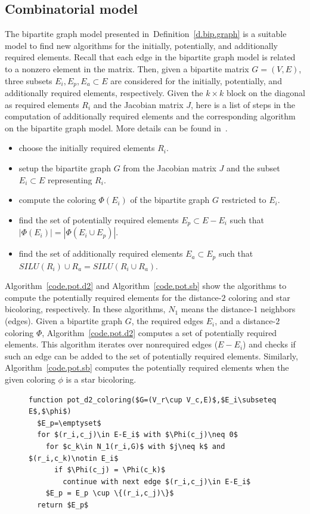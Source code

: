 \documentclass[12pt, twoside,a4paper,toc=bibliography]{scrbook}
\newcommand{\defref}[1]{Definition~\protect\ref{#1}}
\newcommand{\coderef}[1]{Algorithm~\protect\ref{#1}}
\begin{document}
\subsection{Combinatorial model}
\label{ss.comb.precond}
The bipartite graph model presented in~\defref{d.bip.graph} is
a suitable model to find new algorithms for the initially, potentially,
and additionally required elements.
Recall that each edge in the bipartite graph model is related to a nonzero element in
the matrix.
Then, given a bipartite matrix $G = (V,E)$,
three subsets $E_i, E_p, E_a\subset E$
are considered for the initially, potentially,
and additionally required elements, respectively.
Given the $k\times k$ block on the diagonal as required elements $R_i$ and the Jacobian matrix $J$,
here is a list of steps in the computation of additionally required elements
and the corresponding algorithm on the bipartite graph model.
More details can be found in~\cite{Lulfesmann2012Fap}.
\begin{itemize}
\item choose the initially required elements $R_i$.
\item setup the bipartite graph $G$ from the Jacobian matrix $J$ and the subset $E_i\subset E$ representing $R_i$.
\item compute the coloring $\Phi(E_i)$ of the bipartite graph $G$ restricted to $E_i$.
\item find the set of potentially required elements $E_p\subset E - E_i$ such that $|\Phi(E_i)| = |\Phi(E_i \cup E_p)|$.
\item find the set of additionally required elements $E_a\subset E_p$ such that $SILU(R_i) \cup R_a
    = SILU(R_i \cup R_a)$.
\end{itemize}
\coderef{code.pot.d2} and \coderef{code.pot.sb} show the algorithms to compute the
potentially required elements for the distance-$2$ coloring and star bicoloring, respectively.
In these algorithms, $N_1$ means the distance-$1$ neighbors (edges).
Given a bipartite graph $G$, the required edges $E_i$, and a distance-$2$ coloring $\Phi$,
\coderef{code.pot.d2} computes a set of potentially required elements. This algorithm
iterates over nonrequired edges ($E - E_i$) and checks if such an edge can be added to the
set of potentially required elements. Similarly, \coderef{code.pot.sb} computes
the potentially required elements when the given coloring $\phi$ is a star bicoloring.
\begin{figure}
\begin{lstlisting}[caption=Find potentially required elements for
distance-$2$ coloring (based on the algorithm 4.2 from~\cite{Lulfesmann2012Fap}).,label=code.pot.d2,mathescape]
function pot_d2_coloring($G=(V_r\cup V_c,E)$,$E_i\subseteq E$,$\phi$)
  $E_p=\emptyset$
  for $(r_i,c_j)\in E-E_i$ with $\Phi(c_j)\neq 0$
    for $c_k\in N_1(r_i,G)$ with $j\neq k$ and $(r_i,c_k)\notin E_i$
      if $\Phi(c_j) = \Phi(c_k)$
        continue with next edge $(r_i,c_j)\in E-E_i$
    $E_p = E_p \cup \{(r_i,c_j)\}$
  return $E_p$
\end{lstlisting}
\end{figure}
\end{document}
